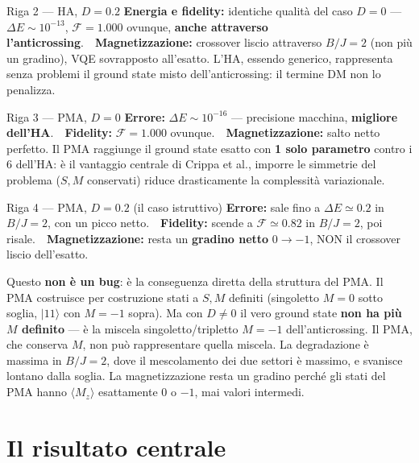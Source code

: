 \documentclass[11pt,a4paper]{article}
\begin{document}
\begin{okbox}{Riga 2 --- HA, $D=0.2$}
\textbf{Energia e fidelity:} identiche qualità del caso $D=0$ ---
$\Delta E\sim10^{-13}$, $\mathcal F=1.000$ ovunque, \textbf{anche
attraverso l'anticrossing}.\ \ \textbf{Magnetizzazione:} crossover
liscio attraverso $B/J=2$ (non più un gradino), VQE sovrapposto
all'esatto. L'HA, essendo generico, rappresenta senza problemi il
ground state misto dell'anticrossing: il termine DM non lo penalizza.
\end{okbox}
\smallskip

\begin{okbox}{Riga 3 --- PMA, $D=0$}
\textbf{Errore:} $\Delta E\sim10^{-16}$ --- precisione macchina,
\textbf{migliore dell'HA}.\ \ \textbf{Fidelity:} $\mathcal F=1.000$
ovunque.\ \ \textbf{Magnetizzazione:} salto netto perfetto. Il PMA
raggiunge il ground state esatto con \textbf{1 solo parametro} contro i
6 dell'HA: è il vantaggio centrale di Crippa et al., imporre le
simmetrie del problema ($S,M$ conservati) riduce drasticamente la
complessità variazionale.
\end{okbox}
\smallskip

\begin{warnbox}{Riga 4 --- PMA, $D=0.2$ (il caso istruttivo)}
\textbf{Errore:} sale fino a $\Delta E\simeq0.2$ in $B/J=2$, con un
picco netto.\ \ \textbf{Fidelity:} scende a $\mathcal F\simeq0.82$ in
$B/J=2$, poi risale.\ \ \textbf{Magnetizzazione:} resta un
\textbf{gradino netto} $0\to-1$, NON il crossover liscio dell'esatto.

Questo \textbf{non è un bug}: è la conseguenza diretta della struttura
del PMA. Il PMA costruisce per costruzione stati a $S,M$ definiti
(singoletto $M=0$ sotto soglia, $|11\rangle$ con $M=-1$ sopra). Ma con
$D\neq0$ il vero ground state \textbf{non ha più $M$ definito} --- è la
miscela singoletto/tripletto $M=-1$ dell'anticrossing. Il PMA, che
conserva $M$, non può rappresentare quella miscela. La degradazione è
massima in $B/J=2$, dove il mescolamento dei due settori è massimo, e
svanisce lontano dalla soglia. La magnetizzazione resta un gradino
perché gli stati del PMA hanno $\langle M_z\rangle$ esattamente $0$ o
$-1$, mai valori intermedi.
\end{warnbox}

\section*{Il risultato centrale}
\end{document}
